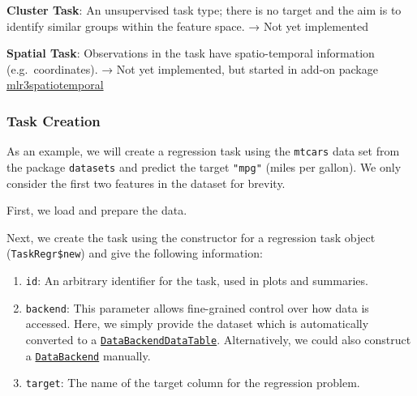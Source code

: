 \documentclass[]{article}
\newenvironment{Shaded}{}{}
\newcommand{\DataTypeTok}[1]{#1}
\newcommand{\DecValTok}[1]{#1}
\newcommand{\KeywordTok}[1]{\textcolor[rgb]{0.00,0.00,1.00}{#1}}
\newcommand{\NormalTok}[1]{#1}
\newcommand{\OperatorTok}[1]{#1}
\newcommand{\StringTok}[1]{\textcolor[rgb]{0.00,0.50,0.50}{#1}}
\providecommand{\tightlist}{%
  \setlength{\itemsep}{0pt}\setlength{\parskip}{0pt}}
\renewenvironment{Shaded} {\begin{snugshade}\small} {\end{snugshade}}
\begin{document}
\textbf{Cluster Task}: An unsupervised task type; there is no target and the aim is to identify similar groups within the feature space.
→ Not yet implemented

\textbf{Spatial Task}: Observations in the task have spatio-temporal information (e.g.~coordinates).
→ Not yet implemented, but started in add-on package \href{https://mlr3spatiotemporal.mlr-org.com}{mlr3spatiotemporal}

\hypertarget{tasks-creation}{%
\subsubsection{Task Creation}\label{tasks-creation}}

As an example, we will create a regression task using the \texttt{mtcars} data set from the package \texttt{datasets} and predict the target \texttt{"mpg"} (miles per gallon).
We only consider the first two features in the dataset for brevity.

First, we load and prepare the data.

\begin{Shaded}
\end{Shaded}

Next, we create the task using the constructor for a regression task object (\texttt{TaskRegr\$new}) and give the following information:

\begin{enumerate}
\def\labelenumi{\arabic{enumi}.}
\tightlist
\item
  \texttt{id}: An arbitrary identifier for the task, used in plots and summaries.
\item
  \texttt{backend}: This parameter allows fine-grained control over how data is accessed.
  Here, we simply provide the dataset which is automatically converted to a \href{https://mlr3.mlr-org.com/reference/DataBackendDataTable.html}{\texttt{DataBackendDataTable}}.
  Alternatively, we could also construct a \href{https://mlr3.mlr-org.com/reference/DataBackend.html}{\texttt{DataBackend}} manually.
\item
  \texttt{target}: The name of the target column for the regression problem.
\end{enumerate}
\end{document}
